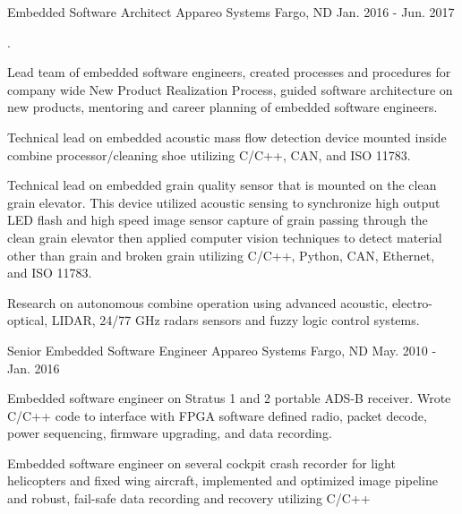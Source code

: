\begin{cventries}
  \cventry
    {Embedded Software Architect} %
    {Appareo Systems} %
    {Fargo, ND} %
    {Jan. 2016 - Jun. 2017} %
    {.
      \begin{cvitems} %
        \item {Lead team of embedded software engineers, created processes and procedures for company wide New Product Realization Process, guided software architecture on new products, mentoring and career planning of embedded software engineers.}
        \item {Technical lead on embedded acoustic mass flow detection device mounted inside combine processor/cleaning shoe utilizing C/C++, CAN, and ISO 11783.}
        \item {Technical lead on embedded grain quality sensor that is mounted on the clean grain elevator. This device utilized acoustic sensing to synchronize high output LED flash and high speed image sensor capture of grain passing through the clean grain elevator then applied computer vision techniques to detect material other than grain and broken grain utilizing C/C++, Python, CAN, Ethernet, and ISO 11783.}
        \item {Research on autonomous combine operation using advanced acoustic, electro-optical, LIDAR, 24/77 GHz radars sensors and fuzzy logic control systems.}
      \end{cvitems}
    }

  \cventry
    {Senior Embedded Software Engineer} %
    {Appareo Systems} %
    {Fargo, ND} %
    {May. 2010 - Jan. 2016} %
    {
      \begin{cvitems} %
        \item {Embedded software engineer on Stratus 1 and 2 portable ADS-B receiver. Wrote C/C++ code to interface with FPGA software defined radio, packet decode, power sequencing, firmware upgrading, and data recording.}
        \item {Embedded software engineer on several cockpit crash recorder for light helicopters and fixed wing aircraft, implemented and optimized image pipeline and robust, fail-safe data recording and recovery utilizing C/C++}
      \end{cvitems}
    }


\end{cventries}
